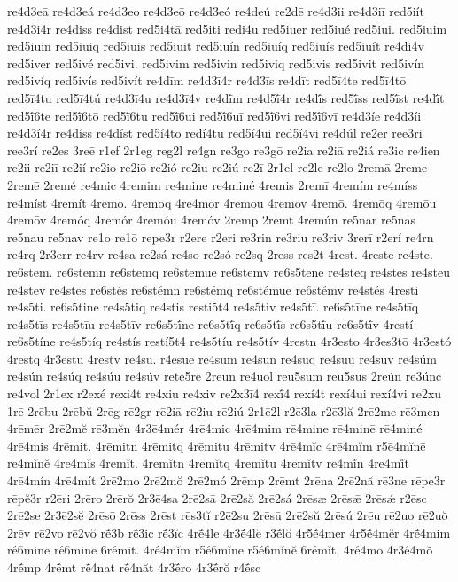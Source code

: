 {re4d3eā
re4d3eá
re4d3eo
re4d3eō
re4d3eó
re4deú
re2dē
re4d3ii
re4d3iī
red5iít
re4d3i4r
re4diss
re4dist
red5i4tā
red5iti
redi4u
red5iuer
red5iué
red5iui.
red5iuim
red5iuin
red5iuiq
red5iuis
red5iuit
red5iuín
red5iuíq
red5iuís
red5iuít
re4di4v
red5iver
red5ivé
red5ivi.
red5ivim
red5ivin
red5iviq
red5ivis
red5ivit
red5ivín
red5ivíq
red5ivís
red5ivít
re4dīm
re4d3ī4r
re4d3īs
re4dīt
red5ī4te
red5ī4tō
red5ī4tu
red5ī4tú
re4d3ī4u
re4d3ī4v
re4dī́m
re4d5ī́4r
re4dī́s
red5ī́ss
red5ī́st
re4dī́t
red5ī́6te
red5ī́6tō
red5ī́6tu
red5ī́6ui
red5ī́6uī
red5ī́6vi
red5ī́6vī
re4d3íe
re4d3íi
re4d3í4r
re4díss
re4díst
red5í4to
redí4tu
red5í4ui
red5í4vi
re4dúl
re2er
ree3ri
ree3rí
re2es
3reē
r1ef
2r1eg
reg2l
re4gn
re3go
re3gō
re2ia
re2iā
re2iá
re3ic
re4ien
re2ii
re2iī
re2ií
re2io
re2iō
re2ió
re2iu
re2iú
re2ī
2r1el
re2le
re2lo
2remā
2reme
2remē
2remé
re4mic
4remim
re4mine
re4miné
4remis
2remī
4remím
re4míss
re4míst
4remít
4remo.
4remoq
4re4mor
4remou
4remov
4remō.
4remōq
4remōu
4remōv
4remóq
4remór
4remóu
4remóv
2remp
2remt
4remún
re5nar
re5nas
re5nau
re5nav
re1o
re1ō
repe3r
r2ere
r2eri
re3rin
re3riu
re3riv
3rerī
r2erí
re4rn
re4rq
2r3err
re4rv
re4sa
re2sá
re4so
re2só
re2sq
2ress
res2t
4rest.
4reste
re4ste.
re6stem.
re6stemn
re6stemq
re6stemue
re6stemv
re6s5tene
re4steq
re4stes
re4steu
re4stev
re4stēs
re6stḗs
re6stémn
re6stémq
re6stémue
re6stémv
re4stés
4resti
re4s5ti.
re6s5tine
re4s5tiq
re4stis
resti5t4
re4s5tiv
re4s5tī.
re6s5tīne
re4s5tīq
re4s5tīs
re4s5tīu
re4s5tīv
re6s5tī́ne
re6s5tī́q
re6s5tī́s
re6s5tī́u
re6s5tī́v
4restí
re6s5tíne
re4s5tíq
re4stís
restí5t4
re4s5tíu
re4s5tív
4restn
4r3esto
4r3es3tō
4r3estó
4restq
4r3estu
4restv
re4su.
r4esue
re4sum
re4sun
re4suq
re4suu
re4suv
re4súm
re4sún
re4súq
re4súu
re4súv
rete5re
2reun
re4uol
reu5sum
reu5sus
2reún
re3únc
re4vol
2r1ex
r2exé
rexi4t
re4xiu
re4xiv
re2x3ī4
rexī́4
rexí4t
rexí4ui
rexí4vi
re2xu
1rē
2rēbu
2rēbŭ
2rēg
rē2gr
rē2iā
rē2iu
rē2iú
2r1ē2l
r2ē3la
r2ē3lă
2rē2me
rē3men
4rēmēr
2rē2mĕ
rē3mĕn
4r3ē4mér
4rē4mic
4rē4mim
rē4mine
rē4minē
rē4miné
4rē4mis
4rēmit.
4rēmitn
4rēmitq
4rēmitu
4rēmitv
4rē4mĭc
4rē4mĭm
r5ē4mĭnē
rē4mĭnĕ
4rē4mĭs
4rēmĭt.
4rēmĭtn
4rēmĭtq
4rēmĭtu
4rēmĭtv
rē4mĭ́n
4rē4mĭ́t
4rē4mín
4rē4mít
2rē2mo
2rē2mŏ
2rē2mó
2rēmp
2rēmt
2rēna
2rē2nă
rē3ne
rēpe3r
rēpĕ3r
r2ēri
2rēro
2rērŏ
2r3ē4sa
2rē2sā
2rē2să
2rē2sá
2rēsæ
2rēsǣ
2rēsǽ
r2ēsc
2rē2se
2r3ē2sĕ
2rēsō
2rēss
2rēst
rēs3tĭ
r2ē2su
2rēsū
2rē2sŭ
2rēsú
2rēu
rē2uo
rē2uŏ
2rēv
rē2vo
rē2vŏ
rḗ3b
rḗ3ic
rḗ3ĭc
4rḗ4le
4r3ḗ4lĕ
r3ḗlŏ
4r5ḗ4mer
4r5ḗ4mĕr
4rḗ4mim
rḗ6mine
rḗ6minē
6rḗmit.
4rḗ4mĭm
r5ḗ6mĭnē
r5ḗ6mĭnĕ
6rḗmĭt.
4rḗ4mo
4r3ḗ4mŏ
4rḗmp
4rḗmt
rḗ4nat
rḗ4năt
4r3ḗro
4r3ḗrŏ
r4ḗsc
}
